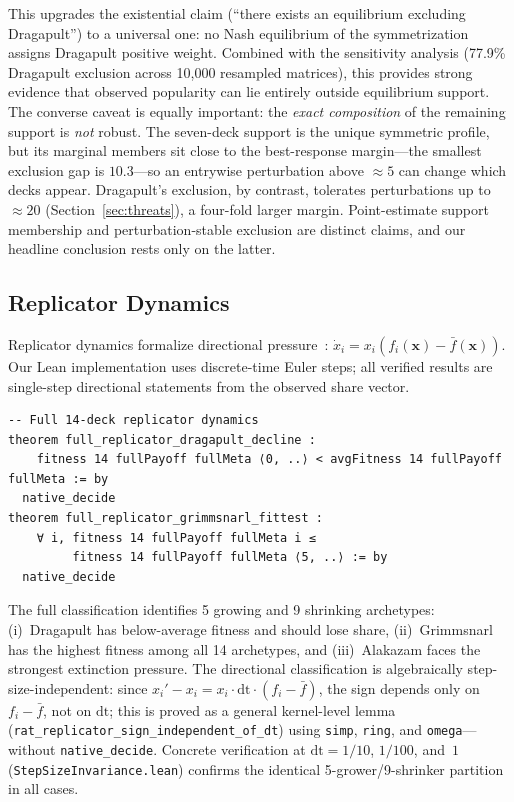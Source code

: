 \documentclass[journal]{IEEEtran}
\newif\ifhighlightchanges
\newcommand{\revised}[1]{\ifhighlightchanges\textcolor{blue!70!black}{#1}\else#1\fi}
\let\origsubsection\subsection
\renewcommand{\subsection}{\needspace{3\baselineskip}\origsubsection}
\begin{document}
This upgrades the existential claim (``there exists an equilibrium excluding Dragapult'') to a universal one: no Nash equilibrium of the symmetrization assigns Dragapult positive weight.
Combined with the sensitivity analysis (77.9\% Dragapult exclusion across 10{,}000 resampled matrices), this provides strong evidence that observed popularity can lie entirely outside equilibrium support.
\revised{The converse caveat is equally important: the \emph{exact composition} of the remaining support is \emph{not} robust. The seven-deck support is the unique symmetric profile, but its marginal members sit close to the best-response margin---the smallest exclusion gap is $10.3$\textperthousand---so an entrywise perturbation above ${\approx}5$\textperthousand{} can change which decks appear. Dragapult's exclusion, by contrast, tolerates perturbations up to ${\approx}20$\textperthousand{} (Section~\ref{sec:threats}), a four-fold larger margin. Point-estimate support membership and perturbation-stable exclusion are distinct claims, and our headline conclusion rests only on the latter.}

\subsection{Replicator Dynamics}

Replicator dynamics formalize directional pressure~\cite{Hofbauer1998,Sandholm2010}:
$\dot{x}_i = x_i(f_i(\mathbf{x}) - \bar{f}(\mathbf{x}))$.
Our Lean implementation uses discrete-time Euler steps; all verified results are single-step directional statements from the observed share vector.

\begin{lstlisting}[caption={Full 14-deck replicator: Dragapult declines, Grimmsnarl fittest.},label={lst:replicator}]
-- Full 14-deck replicator dynamics
theorem full_replicator_dragapult_decline :
    fitness 14 fullPayoff fullMeta ⟨0, ..⟩ < avgFitness 14 fullPayoff fullMeta := by
  native_decide
theorem full_replicator_grimmsnarl_fittest :
    ∀ i, fitness 14 fullPayoff fullMeta i ≤
         fitness 14 fullPayoff fullMeta ⟨5, ..⟩ := by
  native_decide
\end{lstlisting}

The full classification identifies 5 growing and 9 shrinking archetypes:
(i)~Dragapult has below-average fitness and should lose share,
(ii)~Grimmsnarl has the highest fitness among all 14 archetypes, and
(iii)~Alakazam faces the strongest extinction pressure.
The directional classification is algebraically step-size-independent: since $x_i' - x_i = x_i \cdot \mathrm{dt} \cdot (f_i - \bar{f})$, the sign depends only on $f_i - \bar{f}$, not on $\mathrm{dt}$; this is proved as a general kernel-level lemma (\texttt{rat\_replicator\_sign\_independent\allowbreak\_of\_dt}) using \texttt{simp}, \texttt{ring}, and \texttt{omega}---without \texttt{native\_decide}.
Concrete verification at $\mathrm{dt} = 1/10$, $1/100$, and~$1$ (\texttt{StepSizeInvariance.lean}) confirms the identical 5-grower/9-shrinker partition in all cases.
\end{document}
